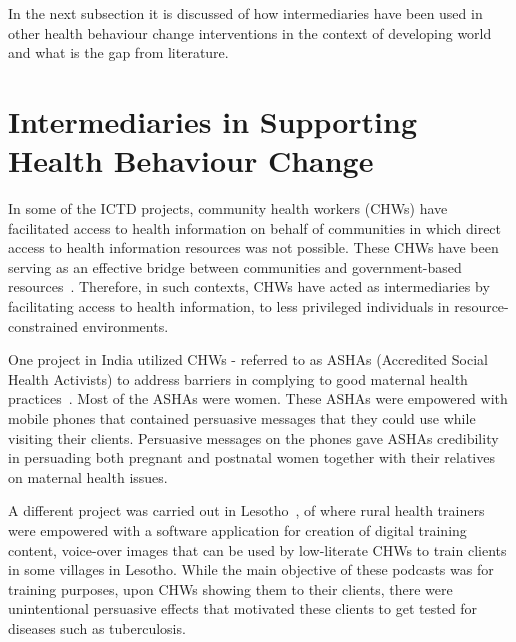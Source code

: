 In the next subsection it is discussed of how intermediaries have been used in other health behaviour change interventions in the context of developing world and what is the gap from literature.

\section{Intermediaries in Supporting Health Behaviour Change}
In some of the ICTD projects, community health workers (CHWs) have facilitated access to health information on behalf of communities in which direct access to health information resources was not possible. These CHWs have been serving as an effective bridge between communities and government-based resources~\citep{katule2016leveraging}. Therefore, in such contexts, CHWs have acted as intermediaries by facilitating access to health information, to less privileged individuals in resource-constrained environments.  

One project in India utilized CHWs - referred to as ASHAs (Accredited Social Health Activists) to address barriers in complying to good maternal health practices~\citep{ramachandran2010mobile,ramachandran2010research}. Most of the ASHAs were women. These ASHAs were empowered with mobile phones that contained persuasive messages that they could use while visiting their clients. Persuasive messages on the phones gave ASHAs credibility in persuading both pregnant and postnatal women together with their relatives on maternal health issues. 

A different project was carried out in Lesotho~\citep{molapo2013software}, of where rural health trainers were empowered with a software application for creation of digital  training  content, voice-over images  that can be used by low-literate CHWs to train clients in some villages in Lesotho. While the main objective of these podcasts was for training purposes, upon CHWs showing them to their clients, there were unintentional persuasive effects that motivated these clients to get tested for diseases such as tuberculosis.

